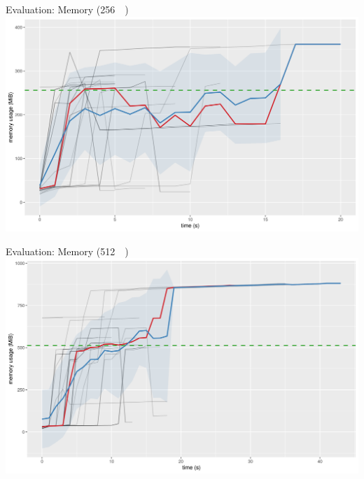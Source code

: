 \documentclass{beamer}
\begin{document}
\begin{frame}{Evaluation: Memory (\SI{256}{\mebi\byte})}
  \includegraphics[width=\textwidth]{../../plots/heap_256.png}
\end{frame}

\begin{frame}{Evaluation: Memory (\SI{512}{\mebi\byte})}
  \includegraphics[width=\textwidth]{../../plots/heap_512.png}
\end{frame}

\end{document}
